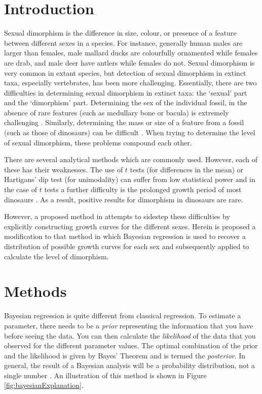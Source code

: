 \documentclass[letterpaper]{article}
\title{\actualTitle}
\author{Eric Campbell \\ \texttt{eric.robert.campbell@gmail.com}}
\date{}
\begin{document}
\maketitle


\section{Introduction}
Sexual dimorphism is the difference in size, colour, or presence of a feature between different sexes in a species. For instance, generally human males are larger than females, male mallard ducks are colourfully ornamented while females are drab, and male deer have antlers while females do not. Sexual dimorphism is very common in extant species, but detection of sexual dimorphism in extinct taxa, especially vertebrates, has been more challenging. Essentially, there are two difficulties in determining sexual dimorphism in extinct taxa: the `sexual' part and the `dimorphism' part. Determining the sex of the individual fossil, in the absence of rare features (such as medullary bone or bacula) is extremely challenging \parencite{saittaEffectSizeStatistical2020}. Similarly, determining the mass or size of a feature from a fossil (such as those of dinosaurs) can be difficult \parencite[p.~126]{brusatte2012}. When trying to determine the level of sexual dimorphism, these problems compound each other.

There are several analytical methods which are commonly used. However, each of these has their weaknesses. The use of $t$ tests (for differences in the mean) or Hartigans' dip test (for unimodality) \parencite{hartiganDipTestUnimodality1985} can suffer from low statistical power \parencite{mallonRecognizingSexualDimorphism2017} and in the case of $t$ tests a further difficulty is the prolonged growth period of most dinosaurs \parencite{honeProtractedGrowthImpedes2017}. As a result, positive results for dimorphism in dinosaurs are rare.

However, a proposed method in \cite{saittaEffectSizeStatistical2020} attempts to sidestep these difficulties by explicitly constructing growth curves for the different sexes. Herein is proposed a modification to that method in which Bayesian regression is used to recover a distribution of possible growth curves for each sex and subsequently applied to calculate the level of dimorphism.


\section{Methods}
Bayesian regression is quite different from classical regression. To estimate a parameter, there needs to be a \emph{prior} representing the information that you have before seeing the data. You can then calculate the \emph{likelihood} of the data that you observed for the different parameter values. The optimal combination of the prior and the likelihood is given by Bayes' Theorem and is termed the \emph{posterior}. In general, the result of a Bayesian analysis will be a probability distribution, not a single number \parencite{mcelreathStatisticalRethinkingBayesian2020}. An illustration of this method is shown in Figure \ref{fig:bayesianExplanation}.
\end{document}
